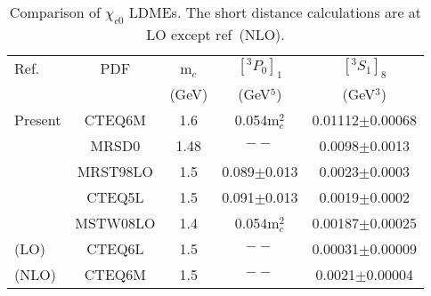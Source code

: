 \documentclass[aps,prc,preprint,superscriptaddress,showpacs,showkeys,amsmath]{revtex4-1}
\begin{document}
\begin{enumerate}
{\begin{table}[h]
\caption{Comparison of $\chi_{c0}$ LDMEs. The short distance calculations are at LO except ref~\cite{Jia:2014jfa}(NLO).}
\begin{tabular}{|l|c|c|c|c|}
\hline            
Ref.                             &PDF     &m$_{c}$      &$[^3P_0]_{1}$                     &$[^3S_1]_{8}$      \\        
                                &        &(GeV)       &(GeV$^5$)                        &(GeV$^3$)         \\
\hline
Present                        &CTEQ6M   &1.6         &0.054m$_{c}^{2}$                 &0.01112$\pm$0.00068\\
\cite{Cho:1995vh}              &MRSD0    &1.48        &$--$                            &0.0098$\pm$0.0013   \\
\cite{Braaten:1999qk}          &MRST98LO &1.5         &0.089$\pm$0.013                 &0.0023$\pm$0.0003    \\
\cite{Braaten:1999qk}          &CTEQ5L   &1.5         &0.091$\pm$0.013                 &0.0019$\pm$0.0002     \\
\cite{Sharma:2012dy}           &MSTW08LO &1.4         &0.054m$_{c}^{2}$                   &0.00187$\pm$0.00025     \\
\cite{Jia:2014jfa}(LO)         &CTEQ6L   &1.5         &$--$                            &0.00031$\pm$0.00009   \\ 
\cite{Jia:2014jfa}(NLO)        &CTEQ6M   &1.5         &$--$                            &0.0021$\pm$0.00004  \\ 
\hline
\end{tabular}
\label{table:LDMEChic0}
\end{table}

}
\end{enumerate}
\end{document}

